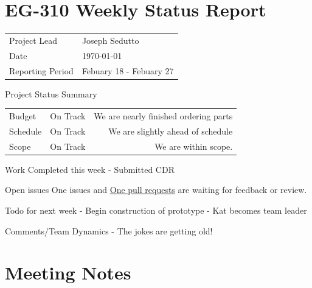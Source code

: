\documentclass{scrartcl}
\begin{document}
\section*{EG-310 Weekly Status Report}
\begin{center}
    \begin{tabular}{ l l }
        Project Lead     & Joseph Sedutto          \\
        Date             & \today         \\
        Reporting Period & Febuary 18 - Febuary 27
    \end{tabular}
\end{center}

\begin{defi}{Project Status Summary}{}
    \begin{tabular}{ l l r }
        Budget   & On Track & We are nearly finished ordering parts         \\
        Schedule & On Track & We are slightly ahead of schedule                     \\
        Scope    & On Track & We are within scope.
    \end{tabular}
\end{defi}

\begin{defi}{Work Completed this week}{}
    - Submitted CDR
\end{defi}

\begin{defi}{Open issues}{}
    One issues and \href{https://github.com/KenwoodFox/EG-310-InvertedPendulum/pulls}{One pull requests} are waiting for feedback or review.
\end{defi}

\begin{defi}{Todo for next week}{}
    - Begin construction of prototype
    - Kat becomes team leader
\end{defi}

\begin{defi}{Comments/Team Dynamics}{}
    - The jokes are getting old!
\end{defi}


\pagebreak
\section{Meeting Notes}

\end{document}
